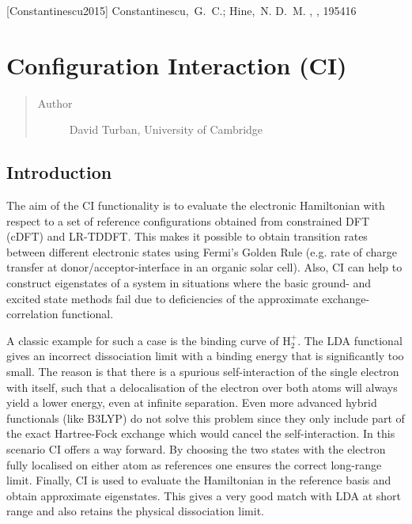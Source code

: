 \documentclass[letterpaper,10pt,english]{sphinxmanual}
\begin{document}
{[}Constantinescu2015{]} Constantinescu, G. C.; Hine, N. D. M.  , , 195416


\section{Configuration Interaction (CI)}
\label{\detokenize{ci::doc}}\label{\detokenize{ci:configuration-interaction-ci}}\begin{quote}\begin{description}
\item[{Author}] \leavevmode
David Turban, University of Cambridge

\end{description}\end{quote}


\subsection{Introduction}
\label{\detokenize{ci:introduction}}
The aim of the CI functionality is to evaluate the electronic
Hamiltonian with respect to a set of reference configurations obtained
from constrained DFT (cDFT) and LR-TDDFT. This makes it possible to
obtain transition rates between different electronic states using
Fermi’s Golden Rule (e.g. rate of charge transfer at
donor/acceptor-interface in an organic solar cell). Also, CI can help to
construct eigenstates of a system in situations where the basic ground-
and excited state methods fail due to deficiencies of the approximate
exchange-correlation functional.

A classic example for such a case is the binding curve of
\(\text{H}_{2}^{+}\). The LDA functional gives an incorrect
dissociation limit with a binding energy that is significantly too
small. The reason is that there is a spurious self-interaction of the
single electron with itself, such that a delocalisation of the electron
over both atoms will always yield a lower energy, even at infinite
separation. Even more advanced hybrid functionals (like B3LYP) do not
solve this problem since they only include part of the exact
Hartree-Fock exchange which would cancel the self-interaction. In this
scenario CI offers a way forward. By choosing the two states with the
electron fully localised on either atom as references one ensures the
correct long-range limit. Finally, CI is used to evaluate the
Hamiltonian in the reference basis and obtain approximate eigenstates.
This gives a very good match with LDA at short range and also retains
the physical dissociation limit.
\end{document}
